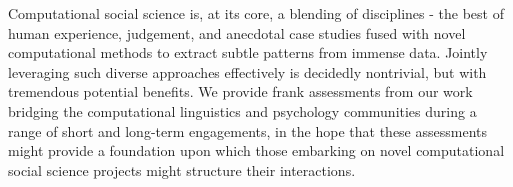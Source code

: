 Computational social science is, at its core, a blending of disciplines - the best of human experience, judgement, and anecdotal case studies fused with novel computational methods to extract subtle patterns from immense data. Jointly leveraging such diverse approaches effectively is decidedly nontrivial, but with tremendous potential benefits. We provide frank assessments from our work bridging the computational linguistics and psychology communities during a range of short and long-term engagements, in the hope that these assessments might provide a foundation upon which those embarking on novel computational social science projects might structure their interactions.
